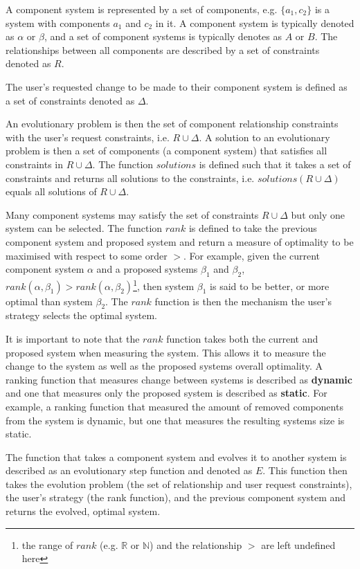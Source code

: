 A component system is represented by a set of components, e.g. $\{a_1,c_2\}$ is a system with components $a_1$ and $c_2$ in it.
A component system is typically denoted as $\alpha$ or $\beta$, and a set of component systems is typically denotes as $A$ or $B$.
The relationships between all components are described by a set of constraints denoted as $R$.

The user's requested change to be made to their component system is defined as a set of constraints denoted as $\Delta$.

An evolutionary problem is then the set of component relationship constraints with the user's request constraints, i.e. $R \cup \Delta$.
A solution to an evolutionary problem is then a set of components (a component system) that satisfies all constraints in $R \cup \Delta$.
The function $solutions$ is defined such that it takes a set of constraints and returns all solutions to the constraints,
i.e. $solutions(R \cup \Delta)$ equals all solutions of $R \cup \Delta$.

Many component systems may satisfy the set of constraints $R \cup \Delta$ but only one system can be selected.
The function $rank$ is defined to take the previous component system and proposed system and return a measure of optimality to be maximised with respect to some order $>$. 
For example, given the current component system $\alpha$ and a proposed systems $\beta_1$ and $\beta_2$, 
$rank(\alpha,\beta_1) > rank(\alpha,\beta_2)$\footnote{the range of $rank$ (e.g. $\mathbb{R}$ or $\mathbb{N}$) and the relationship $>$ are left undefined here},
then system $\beta_1$ is said to be better, or more optimal than system $\beta_2$.
The $rank$ function is then the mechanism the user's strategy selects the optimal system.

It is important to note that the $rank$ function takes both the current and proposed system when measuring the system.
This allows it to measure the change to the system as well as the proposed systems overall optimality.
A ranking function that measures change between systems is described as \textbf{dynamic} and one that measures only the proposed system is described as \textbf{static}.
For example, a ranking function that measured the amount of removed components from the system is dynamic, but one that measures the resulting systems size is static.

The function that takes a component system and evolves it to another system is described as an evolutionary step function and denoted as $E$.
This function then takes the evolution problem (the set of relationship and user request constraints), 
the user's strategy (the rank function), and the previous component system and returns the evolved, optimal system.

